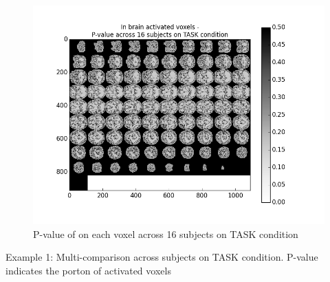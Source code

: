 \begin{figure}[H] 
\centering \includegraphics[scale=0.5]{../fig/multi_beta/pval_task.png}	 
\caption{P-value of on each voxel across 16 subjects on TASK condition}
\end{figure} 

\begin{center}
Example 1: Multi-comparison across subjects on TASK condition. P-value indicates the porton of activated
voxels
\end{center}

